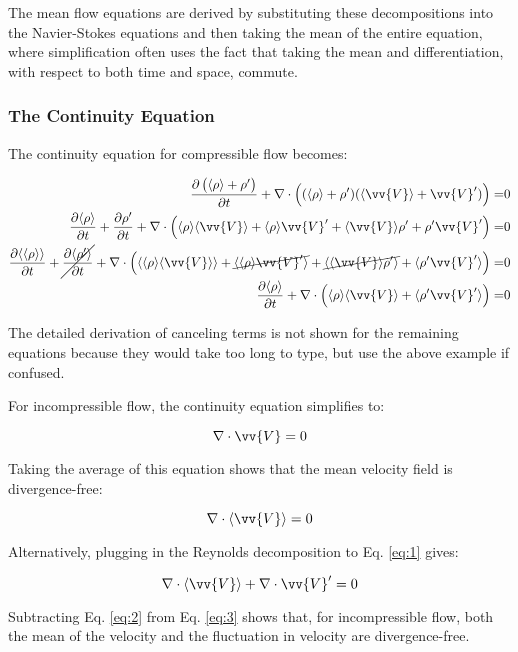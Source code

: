 \documentclass[10pt]{article}
\newcommand{\beq}{\begin{equation}}
\newcommand{\eeq}{\end{equation}}
\newcommand{\beqa}{\begin{equation}\begin{aligned}}
\newcommand{\eeqa}{\end{aligned}\end{equation}}
\newcommand{\la}{\langle}
\newcommand{\ra}{\rangle}
\newcounter{subsubsubsection}[subsubsection]
\begin{document}
\begin{flushleft}
The mean flow equations are derived by substituting these decompositions into the Navier-Stokes equations and then taking the mean of the entire equation, where simplification often uses the fact that taking the mean and differentiation, with respect to both time and space, commute. 


\subsubsection{The Continuity Equation}
The continuity equation for compressible flow becomes:

\beqa
\frac{\partial \left(\la\rho\ra+\rho'\right)}{\partial t}+\nabla\cdot \left((\la\rho\ra+\rho')(\la\vv{V}\ra+\vv{V}')\right)=&0\\
\frac{\partial\la\rho\ra}{\partial t}+\frac{\partial\rho'}{\partial t}+\nabla\cdot \left(\la\rho\ra\la\vv{V}\ra+\la\rho\ra\vv{V}'+\la\vv{V}\ra\rho'+\rho'\vv{V}'\right)=&0\\
\frac{\partial\la\la\rho\ra\ra}{\partial t}+\cancel{\frac{\partial\la\rho'\ra}{\partial t}}+\nabla\cdot\left(\la\la\rho\ra\la\vv{V}\ra\ra+\cancel{\la\la\rho\ra\vv{V}'\ra}+\cancel{\la\la\vv{V}\ra\rho'\ra}+\la\rho'\vv{V}'\ra\right)=&0\\
\frac{\partial\la\rho\ra}{\partial t}+\nabla\cdot\left(\la\rho\ra\la\vv{V}\ra+\la\rho'\vv{V}'\ra\right)=&0\\
\eeqa

The detailed derivation of canceling terms is not shown for the remaining equations because they would take too long to type, but use the above example if confused. 


For incompressible flow, the continuity equation simplifies to:

\beq
\label{eq:1}
\nabla\cdot\vv{V}=0
\eeq

Taking the average of this equation shows that the mean velocity field is divergence-free:

\beq
\label{eq:2}
\nabla\cdot\la\vv{V}\ra=0
\eeq

Alternatively, plugging in the Reynolds decomposition to Eq. \eqref{eq:1} gives:

\beq
\label{eq:3}
\nabla\cdot\la\vv{V}\ra+\nabla\cdot\vv{V}'=0
\eeq

Subtracting Eq. \eqref{eq:2} from Eq. \eqref{eq:3} shows that, for incompressible flow, both the mean of the velocity and the fluctuation in velocity are divergence-free. 



\end{flushleft}
\end{document}
